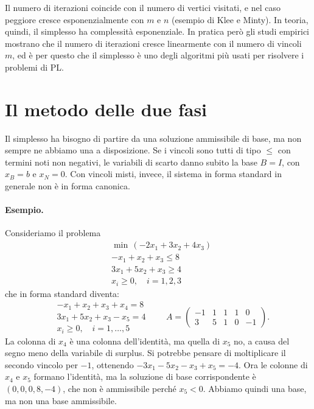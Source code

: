 Il numero di iterazioni coincide con il numero di vertici visitati, e nel caso peggiore cresce esponenzialmente con $m$ e $n$ (esempio di Klee e Minty). In teoria, quindi, il simplesso ha complessità esponenziale. In pratica però gli studi empirici mostrano che il numero di iterazioni cresce linearmente con il numero di vincoli $m$, ed è per questo che il simplesso è uno degli algoritmi più usati per risolvere i problemi di PL.

\section{Il metodo delle due fasi}\label{sec:due-fasi}
Il simplesso ha bisogno di partire da una soluzione ammissibile di base, ma non sempre ne abbiamo una a disposizione. Se i vincoli sono tutti di tipo $\le$ con termini noti non negativi, le variabili di scarto danno subito la base $B = I$, con $x_B = b$ e $x_N = 0$. Con vincoli misti, invece, il sistema in forma standard in generale non è in forma canonica.

\paragraph{Esempio.}
Consideriamo il problema
\[
\begin{aligned}
&\min\, (-2x_1 + 3x_2 + 4x_3) \\
&{-x_1} + x_2 + x_3 \le 8 \\
&3x_1 + 5x_2 + x_3 \ge 4 \\
&x_i \ge 0, \quad i = 1, 2, 3
\end{aligned}
\]
che in forma standard diventa:
\[
\begin{aligned}
&{-x_1} + x_2 + x_3 + x_4 = 8 \\
&3x_1 + 5x_2 + x_3 - x_5 = 4 \\
&x_i \ge 0, \quad i = 1, \dots, 5
\end{aligned}
\qquad
A = \begin{pmatrix} -1 & 1 & 1 & 1 & 0 \\ 3 & 5 & 1 & 0 & -1 \end{pmatrix}.
\]
La colonna di $x_4$ è una colonna dell'identità, ma quella di $x_5$ no, a causa del segno meno della variabile di surplus. Si potrebbe pensare di moltiplicare il secondo vincolo per $-1$, ottenendo $-3x_1 - 5x_2 - x_3 + x_5 = -4$. Ora le colonne di $x_4$ e $x_5$ formano l'identità, ma la soluzione di base corrispondente è $(0, 0, 0, 8, -4)$, che non è ammissibile perché $x_5 < 0$. Abbiamo quindi una base, ma non una base ammissibile.

